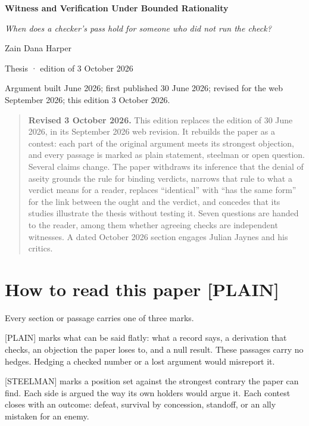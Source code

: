 \documentclass[11pt]{article}
\newcommand{\register}[1]{{\ttfamily\small #1}}
\begin{document}
\begin{center}
{\LARGE\bfseries Witness and Verification Under Bounded Rationality\par}
\medskip
{\large\emph{When does a checker's pass hold for someone who did not run the check?}\par}
\medskip
Zain Dana Harper\par
{\small Thesis · edition of 3 October 2026\par}
{\small Argument built June 2026; first published 30 June 2026; revised for the web September 2026; this edition 3 October 2026.\par}
\end{center}

\begin{quote}\small
\textbf{Revised 3 October 2026.} This edition replaces the edition of 30 June 2026, in its September 2026 web revision. It rebuilds the paper as a contest: each part of the original argument meets its strongest objection, and every passage is marked as plain statement, steelman or open question. Several claims change. The paper withdraws its inference that the denial of aseity grounds the rule for binding verdicts, narrows that rule to what a verdict means for a reader, replaces ``identical'' with ``has the same form'' for the link between the ought and the verdict, and concedes that its studies illustrate the thesis without testing it. Seven questions are handed to the reader, among them whether agreeing checks are independent witnesses. A dated October 2026 section engages Julian Jaynes and his critics.
\end{quote}
\section*{How to read this paper \register{[PLAIN]}}

Every section or passage carries one of three marks.

\register{[PLAIN]} marks what can be said flatly: what a record says, a derivation that checks, an objection the paper loses to, and a null result. These passages carry no hedges. Hedging a checked number or a lost argument would misreport it.

\register{[STEELMAN]} marks a position set against the strongest contrary the paper can find. Each side is argued the way its own holders would argue it. Each contest closes with an outcome: defeat, survival by concession, standoff, or an ally mistaken for an enemy.
\end{document}
